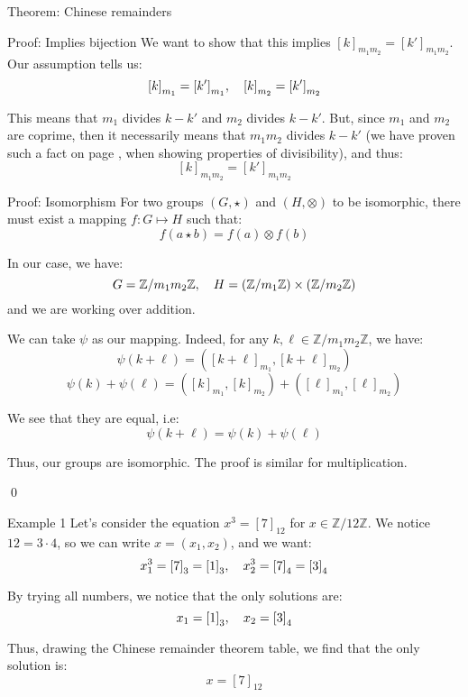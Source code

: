 \documentclass[a4paper]{article}
\begin{document}
\begin{parag}{Theorem: Chinese remainders}
\begin{subparag}{Proof: Implies bijection}
        We want to show that this implies $\left[k\right]_{m_1m_2} = \left[k'\right]_{m_1m_2}$. Our assumption tells us:
        \[\left[k\right]_{m_1} = \left[k'\right]_{m_1}, \mathspace \left[k\right]_{m_2} = \left[k'\right]_{m_2}\]

        This means that $m_1$ divides $k - k'$ and $m_2$ divides $k - k'$. But, since $m_1$ and $m_2$ are coprime, then it necessarily means that $m_1 m_2$ divides $k - k'$ (we have proven such a fact on page \pageref{ref:divisibilityPropertiesForChineseRemaindersTheorem}, when showing properties of divisibility), and thus:
        \[\left[k\right]_{m_1 m_2} = \left[k'\right]_{m_1 m_2}\]
    \end{subparag}

    \begin{subparag}{Proof: Isomorphism}
        For two groups $\left(G, \star\right)$ and $\left(H, \otimes\right)$ to be isomorphic, there must exist a mapping $f : G \mapsto H$ such that:
        \[f\left(a \star b\right) = f\left(a\right) \otimes f\left(b\right)\]

        In our case, we have:
        \[G = \mathbb{Z} / m_1 m_2 \mathbb{Z}, \mathspace H = \left(\mathbb{Z}/ m_1 \mathbb{Z}\right) \times \left(\mathbb{Z} / m_2 \mathbb{Z}\right)\]
        and we are working over addition.

        We can take $\psi$ as our mapping. Indeed, for any $k, \ell \in \mathbb{Z} / m_1 m_2 \mathbb{Z}$, we have:
        \[\psi\left(k + \ell\right) = \left(\left[k + \ell\right]_{m_1}, \left[k + \ell \right]_{m_2}\right)\]
        \[\psi\left(k\right) + \psi\left(\ell \right) = \left(\left[k\right]_{m_1}, \left[k\right]_{m_2}\right) + \left(\left[\ell \right]_{m_1}, \left[\ell \right]_{m_2}\right)\]

        We see that they are equal, i.e:
        \[\psi\left(k + \ell\right) = \psi\left(k\right) + \psi\left(\ell\right)\]

        Thus, our groups are isomorphic. The proof is similar for multiplication.

        \qed
    \end{subparag}
\end{parag}

\begin{parag}{Example 1}
    Let's consider the equation $x^3 = \left[7\right]_{12}$ for $x \in\mathbb{Z}/12 \mathbb{Z}$. We notice $12 = 3\cdot 4$, so we can write $x = \left(x_1, x_2\right)$, and we want:
    \[x_1^3 = \left[7\right]_3 = \left[1\right]_3, \mathspace x_2^3 = \left[7\right]_4 = \left[3\right]_4\]

    By trying all numbers, we notice that the only solutions are:
    \[x_1 = \left[1\right]_3, \mathspace x_2 = \left[3\right]_4\]

    Thus, drawing the Chinese remainder theorem table, we find that the only solution is:
    \[x = \left[7\right]_{12}\]
\end{parag}
\end{document}
